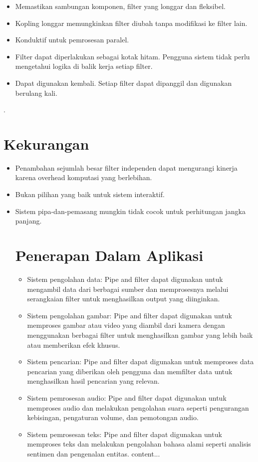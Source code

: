 \documentclass{article}
\begin{document}
	\begin{itemize}
		\item Memastikan sambungan komponen, filter yang longgar dan fleksibel.
		\item Kopling longgar memungkinkan filter diubah tanpa modifikasi ke filter lain.
		\item Konduktif untuk pemrosesan paralel.
		\item Filter dapat diperlakukan sebagai kotak hitam. Pengguna sistem tidak perlu mengetahui logika di balik kerja setiap filter.
		\item Dapat digunakan kembali. Setiap filter dapat dipanggil dan digunakan berulang kali.
	\end{itemize}
	.
	
	
	\section{Kekurangan}
	
	\begin{itemize}
		\item  Penambahan sejumlah besar filter independen dapat mengurangi kinerja karena overhead komputasi yang berlebihan.
		\item Bukan pilihan yang baik untuk sistem interaktif.
		\item Sistem pipa-dan-pemasang mungkin tidak cocok untuk perhitungan jangka panjang.
		
		\section{Penerapan Dalam Aplikasi}
		\begin{itemize}
			\item Sistem pengolahan data: Pipe and filter dapat digunakan untuk mengambil data dari berbagai sumber dan memprosesnya melalui serangkaian filter untuk menghasilkan output yang diinginkan.
			
			\item Sistem pengolahan gambar: Pipe and filter dapat digunakan untuk memproses gambar atau video yang diambil dari kamera dengan menggunakan berbagai filter untuk menghasilkan gambar yang lebih baik atau memberikan efek khusus.
			
			\item Sistem pencarian: Pipe and filter dapat digunakan untuk memproses data pencarian yang diberikan oleh pengguna dan memfilter data untuk menghasilkan hasil pencarian yang relevan.
			
			\item Sistem pemrosesan audio: Pipe and filter dapat digunakan untuk memproses audio dan melakukan pengolahan suara seperti pengurangan kebisingan, pengaturan volume, dan pemotongan audio.
			
			\item Sistem pemrosesan teks: Pipe and filter dapat digunakan untuk memproses teks dan melakukan pengolahan bahasa alami seperti analisis sentimen dan pengenalan entitas.
			content...
		\end{itemize}
	\end{itemize}
\end{document}
